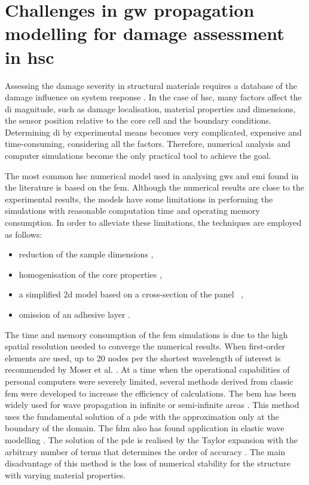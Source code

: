 \section{Challenges in \acl{gw} propagation modelling for damage assessment in \acl{hsc}}
\label{sec:challenges}

Assessing the damage severity in structural materials requires a database of the damage influence on system response \cite{worden2007fundamental}.
In the case of \ac{hsc}, many factors affect the \ac{di} magnitude, such as damage localisation, material properties and dimensions, the sensor position relative to the core cell and the boundary conditions.
Determining \ac{di} by experimental means becomes very complicated, expensive and time-consuming, considering all the factors.
Therefore, numerical analysis and computer simulations become the only practical tool to achieve the goal.

The most common \ac{hsc} numerical model used in analysing \acp{gw} and \ac{emi} found in the literature is based on the \ac{fem}.
Although the numerical results are close to the experimental results, the models have some limitations in performing the simulations with reasonable computation time and operating memory consumption.
In order to alleviate these limitations, the techniques are employed as follows:
\begin{itemize}
\item reduction of the sample dimensions \cite{hosseini2013numerical, tian2015wavenumber},
\item homogenisation of the core properties \cite{catapano2014multi, zhou2020debonding},
\item a simplified \acl{2d} model based on a cross-section of the panel~ \cite{li2019detection},
\item omission of an adhesive layer \cite{mustapha2013non}.
\end{itemize}

The time and memory consumption of the \ac{fem} simulations is due to the high spatial resolution needed to converge the numerical results.
When first-order elements are used, up to 20 nodes per the shortest wavelength of interest is recommended by Moser et al. \cite{moser1999modeling}.
At a time when the operational capabilities of personal computers were severely limited, several methods derived from classic \ac{fem} were developed to increase the efficiency of calculations.
The \ac{bem} has been widely used for wave propagation in infinite or semi-infinite areas \cite{brebbia1984boundary}.
This method uses the fundamental solution of a \ac{pde} with the approximation only at the boundary of the domain.
The \ac{fdm} also has found application in elastic wave modelling \cite{delsantoO1992connection}.
The solution of the \ac{pde} is realised by the Taylor expansion with the arbitrary number of terms that determines the order of accuracy \cite{willberg2015simulation}.
The main disadvantage of this method is the loss of numerical stability for the structure with varying material properties.

